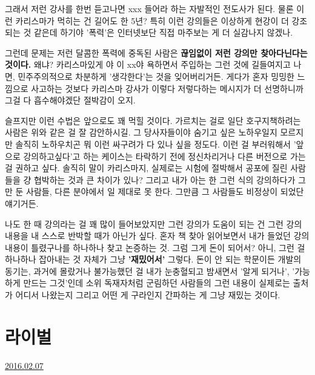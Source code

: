 그래서 저런 강사를 한번 듣고나면 xxx 들어라 하는 자발적인 전도사가 된다.
물론 이런 카리스마가 먹히는 건 길어도 한 5년?
특히 이런 강의들은 이상하게 현강이 더 강조되는 것 같은데 하기야 '폭력'은 인터넷보단 직접 마주보는 게 더 실감나지 않겠나.
\vspace{5mm}

그런데 문제는 저런 달콤한 폭력에 중독된 사람은 \textbf{끊임없이 저런 강의만 찾아다닌다는 것이다.}
왜냐? 카리스마있게 야 이 xx야 욕하면서 주입하는 그런 것에 길들여지고 나면, 민주주의적으로 차분하게 '생각한다'는 것을 잊어버리거든.
게다가 혼자 밍밍한 느낌으로 사고하는 것보다 카리스마 강사가 이렇다 저렇다하는 메시지가 더 선명하니까 그걸 다 흡수해야겠단 절박감이 오지.
\vspace{5mm}

슬프지만 이런 수법은 앞으로도 꽤 먹힐 것이다. 가르치는 걸로 일단 호구지책하려는 사람은 위와 같은 걸 잘 감안하시길.
그 당사자들이야 숨기고 싶은 노하우일지 모르지만 솔직히 노하우치곤 뭐 이런 싸구려가 다 있나 싶을 정도다.
이런 걸 부러워해서 '앞으로 강의하고싶다'고 하는 케이스는 타락하기 전에 정신차리거나 다른 버전으로 가는 걸 권하고 싶다.
솔직히 말이 카리스마지, 실제로는 시험에 절박해서 공포에 질린 사람들을 걍 협박하는 것과 큰 차이가 있나?
그리고 내가 아는 한 그런 식의 강의하다가 그만 둔 사람들, 다른 분야에서 일 제대로 못 한다. 그만큼 그 사람들도 비정상이 되었단 얘기거든.
\vspace{5mm}

나도 한 때 강의라는 걸 꽤 많이 들어보았지만 그런 강의가 도움이 되는 건
그런 강의 내용을 내 스스로 반박할 때가 아닌가 싶다.
혼자 책 찾아 읽어보면서 내가 들었던 강의 내용이 틀렸구나를 하나하나 찾고 논증하는 것.
그럼 그게 돈이 되어서? 아니, 그런 걸 하나하나 잡아내는 것 자체가 그냥 \textbf{'재밌어서'} 그렇다.
돈이 안 되는 학문이든 개발의 동기는, 과거에 몰랐거나 불가능했던 걸 내가 눈충혈되고 밤새면서 '알게 되거나', '가능하게 만드는 그것'인데
소위 독재자처럼 군림하던 사람들의 그런 내용이 실제로는 출처가 어디서 나왔는지 그리고 어떤 게 구라인지 간파하는 게 그냥 재밌는 것이다.
\vspace{5mm}









\section{라이벌}
\href{https://www.kockoc.com/Apoc/626811}{2016.02.07}

\vspace{5mm}

